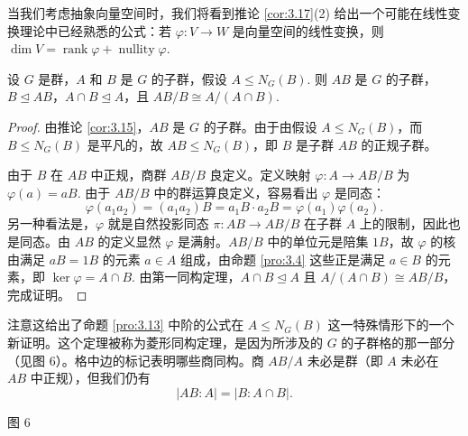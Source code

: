当我们考虑抽象向量空间时，我们将看到推论 \ref{cor:3.17}(2) 给出一个可能在线性变换理论中已经熟悉的公式：若 \(\varphi : V \to W\) 是向量空间的线性变换，则 \(\dim V = \operatorname{rank}\varphi + \operatorname{nullity}\varphi\).

\begin{theorem}[第二同构定理或菱形同构定理]\label{thm:3.18}
设 \(G\) 是群，\(A\) 和 \(B\) 是 \(G\) 的子群，假设 \(A \leq N_G(B)\). 则 \(AB\) 是 \(G\) 的子群，\(B \trianglelefteq AB\)，\(A \cap B \trianglelefteq A\)，且 \(AB/B \cong A/(A \cap B)\).
\end{theorem}

\begin{proof}
由推论 \ref{cor:3.15}，\(AB\) 是 \(G\) 的子群。由于由假设 \(A \leq N_G(B)\)，而 \(B \leq N_G(B)\) 是平凡的，故 \(AB \leq N_G(B)\)，即 \(B\) 是子群 \(AB\) 的正规子群。

由于 \(B\) 在 \(AB\) 中正规，商群 \(AB/B\) 良定义。定义映射 \(\varphi : A \to AB/B\) 为 \(\varphi(a) = aB\). 由于 \(AB/B\) 中的群运算良定义，容易看出 \(\varphi\) 是同态：
\[
\varphi(a_1 a_2) = (a_1 a_2)B = a_1 B \cdot a_2 B = \varphi(a_1)\varphi(a_2).
\]
另一种看法是，\(\varphi\) 就是自然投影同态 \(\pi : AB \to AB/B\) 在子群 \(A\) 上的限制，因此也是同态。由 \(AB\) 的定义显然 \(\varphi\) 是满射。\(AB/B\) 中的单位元是陪集 \(1B\)，故 \(\varphi\) 的核由满足 \(aB = 1B\) 的元素 \(a \in A\) 组成，由命题 \ref{pro:3.4} 这些正是满足 \(a \in B\) 的元素，即 \(\ker \varphi = A \cap B\). 由第一同构定理，\(A \cap B \trianglelefteq A\) 且 \(A/(A \cap B) \cong AB/B\)，完成证明。
\end{proof}

注意这给出了命题 \ref{pro:3.13} 中阶的公式在 \(A \leq N_G(B)\) 这一特殊情形下的一个新证明。这个定理被称为菱形同构定理，是因为所涉及的 \(G\) 的子群格的那一部分（见图 6）。格中边的标记表明哪些商同构。商 \(AB/A\) 未必是群（即 \(A\) 未必在 \(AB\) 中正规），但我们仍有
\[
|AB : A| = |B : A \cap B|.
\]

\begin{center}

图 6
\end{center}

